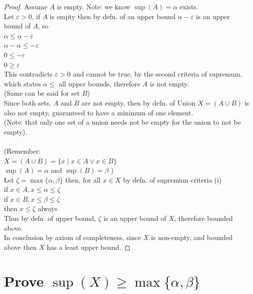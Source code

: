 \documentclass{article}
\begin{document}
\begin{proof} 
Assume $A$ is empty. Note: we know $\sup(A) = \alpha$ exists.\\
Let $\varepsilon > 0$, if $A$ is empty then by defn. of an upper bound $\alpha - \varepsilon$ is an upper bound of $A$, so\\
\indent $\alpha \leq \alpha - \varepsilon$\\
\indent $\alpha - \alpha \leq -\varepsilon$\\
\indent $0 \leq -\varepsilon$\\
\indent $0 \geq \varepsilon$\\
This contradicts $\varepsilon > 0$ and cannot be true, by the second criteria of supremum, which states $\alpha \leq$ all upper bounds, therefore $A$ is not empty.\\ (Same can be said for set $B$)\\
Since both sets, $A$ and $B$ are not empty, then by defn. of Union $X = (A \cup B)$ is also not empty, guaranteed to have a minimum of one element.\\
(Note: that only one set of a union needs not be empty for the union to not be empty).\\
\\
(Remember: \\
\indent $X = (A \cup B) = \{x \mid x \in A \lor x \in B\}$\\
\indent $\sup(A) = \alpha$ and $\sup(B) = \beta$ )\\
Let $\zeta = \max\{\alpha,\beta\}$ then, for all $x \in X$ by defn. of supremum criteria (i)\\
\indent if $x \in A, x \leq \alpha \leq \zeta$\\
\indent if $x \in B, x \leq \beta \leq \zeta$\\
then $x \leq \zeta$ always\\
Thus by defn. of upper bound, $\zeta$ is an upper bound of $X$, therefore bounded above.
\\
In conclusion by axiom of completeness, since $X$ is non-empty, and bounded above then $X$ has a least upper bound.
\end{proof}

\section{Prove $\sup(X) \geq \max\{\alpha,\beta\}$}
\end{document}
